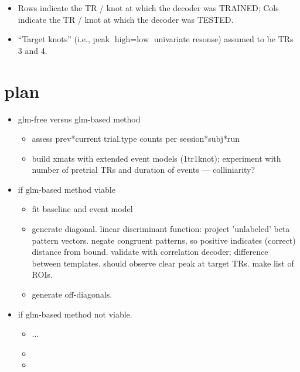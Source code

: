 \documentclass{article}\usepackage[]{graphicx}\usepackage[]{color}
\begin{document}
\begin{itemize}
  \item Rows indicate the TR / knot at which the decoder was TRAINED; Cols indicate the TR / knot at which the decoder was TESTED.
  \item ``Target knots'' (i.e., peak $\text{high} = \text{low}$ univariate resonse) assumed to be TRs 3 and 4.
\end{itemize}


% 
% 			

\section*{plan}

\begin{itemize}
  \item glm-free versus glm-based method
    
    \begin{itemize}
      \item assess prev*current trial.type counts per session*subj*run
      \item  build xmats with extended event models (1tr1knot); experiment with number of pretrial TRs and duration of events --- colliniarity?
    \end{itemize}
    
  \item if glm-based method viable
  
  \begin{itemize}
    \item fit baseline and event model
    \item generate diagonal.
    linear discriminant function: project 'unlabeled' beta pattern vectors. 
    negate congruent patterns, so positive indicates (correct) distance from bound. 
    validate with correlation decoder; difference between templates.
    should observe clear peak at target TRs. 
    make list of ROIs.
    \item generate off-diagonals.
  \end{itemize}
  
  \item if glm-based method not viable.
  
  \begin{itemize}
    \item ...
    \item 
    \item 
  \end{itemize}
  
\end{itemize}
\end{document}

